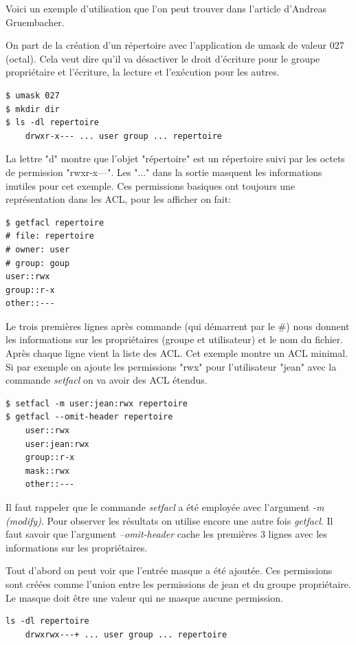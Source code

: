 Voici un exemple d'utilisation que l'on peut trouver dans l'article d'Andreas Gruembacher\cite{aclsuse}.

On part de la création d'un répertoire avec l'application de umask de valeur 027 (octal). Cela veut dire qu'il va désactiver le droit d'écriture pour le groupe propriétaire et l'écriture, la lecture et l'exécution pour les autres.

\begin{verbatim}
$ umask 027 
$ mkdir dir 
$ ls -dl repertoire
	drwxr-x--- ... user group ... repertoire
\end{verbatim}

La lettre "d" montre que l'objet "répertoire" est un répertoire suivi par les octets de permission "rwxr-x---". Les "..." dans la sortie masquent les informations inutiles pour cet exemple. Ces permissions basiques ont toujours une représentation dans les ACL, pour les afficher on fait:

\begin{verbatim}
$ getfacl repertoire
# file: repertoire 
# owner: user 
# group: goup
user::rwx
group::r-x
other::---
\end{verbatim}

Le trois premières lignes après commande (qui démarrent par le \#) nous donnent les informations sur les propriétaires (groupe et utilisateur) et le nom du fichier. Après chaque ligne vient la liste des ACL. Cet exemple montre un ACL minimal. Si par exemple on ajoute les permissions "rwx" pour l'utilisateur "jean" avec la commande \emph{setfacl} on va avoir des ACL étendus.

\begin{verbatim}
$ setfacl -m user:jean:rwx repertoire
$ getfacl --omit-header repertoire 
	user::rwx 
	user:jean:rwx	
	group::r-x 
	mask::rwx 
	other::---
\end{verbatim}

Il faut rappeler que le commande \emph{setfacl} a été employée avec l'argument \emph{-m (modify)}. Pour observer les résultats on utilise encore une autre fois \emph{getfacl}. Il faut savoir que l'argument \emph{--omit-header} cache les premières 3 lignes avec les informations sur les propriétaires.  

Tout d'abord on peut voir que l'entrée masque a été ajoutée. Ces permissions sont créées comme l'union entre les permissions de jean et du groupe propriétaire. Le masque doit être une valeur qui ne masque aucune permission.  

\begin{verbatim}
ls -dl repertoire
	drwxrwx---+ ... user group ... repertoire
\end{verbatim}

